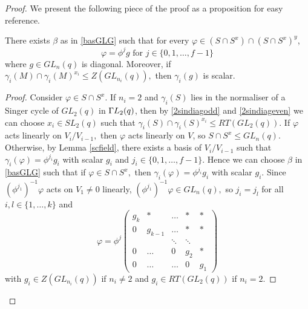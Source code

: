 \begin{proof}
 
  We present the following piece of the proof as a proposition for easy reference. 
\begin{Prop} 
\label{clm44}
There exists $\beta$ as in \eqref{basGLG} such that for every $\varphi \in (S \cap S^x) \cap (S \cap S^x)^y$, 
$$\varphi=\phi^j g \text{ for } j \in \{0,1, \ldots,f-1\}$$
where $g \in GL_n(q)$ is diagonal.
 Moreover, if  $\gamma_i(M) \cap \gamma_i(M)^{x_i} \le Z(GL_{n_i}(q)),$ then $\gamma_i(g)$ is scalar. 
\end{Prop}
\begin{proof}
Consider $\varphi \in S \cap S^x.$ If $n_i=2$ and $\gamma_i(S)$ lies in the normaliser of a Singer cycle of $GL_2(q)$ in ${{\Gamma L}}_2(q)$, then by \eqref{2sindiagodd} and \eqref{2sindiageven} we can choose $x_i \in SL_2(q)$ such that $\gamma_i(S) \cap \gamma_i(S)^{x_i}\le RT(GL_2(q))$.  If $\varphi$ acts linearly on $V_i/V_{i-1},$ then $\varphi$ acts linearly on $V$, so $S \cap S^x \le GL_n(q)$.   Otherwise, by Lemma \ref{scfield}, there exists a basis of $V_i/V_{i-1}$ such that $\gamma_i(\varphi)= \phi^{j_i} g_i$ with scalar $g_i$ and $j_i \in \{0,1, \ldots , f-1 \}.$ Hence we can choose $\beta$ in \eqref{basGLG} such that if $\varphi \in S \cap S^x,$ then $\gamma_i(\varphi)= \phi^{j_i} g_i$ with scalar $g_i.$ Since $(\phi^{j_1})^{-1} \varphi$ acts on $V_1\ne 0$ linearly,   $(\phi^{j_1})^{-1} \varphi \in GL_n(q),$ so $j_i=j_l$ for all $i,l \in \{1, \ldots, k\}$
and 
\begin{equation}
\label{phitri}
\varphi = \phi^j 
\begin{pmatrix}
g_k     & * & \ldots & * & * \\
0          &    g_{k-1}  & \ldots & * & * \\
     &     & \ddots & \ddots  &    \\
   0    &    \ldots& 0 & g_{2} & * \\
      0    &   \ldots        & \ldots& 0 & g_{1}
\end{pmatrix}
\end{equation}
 with $g_i \in Z(GL_{n_i}(q))$ if $n_i \ne 2$ and $g_i \in RT(GL_2(q))$ if $n_i=2.$ 


\end{proof}
\end{proof}
